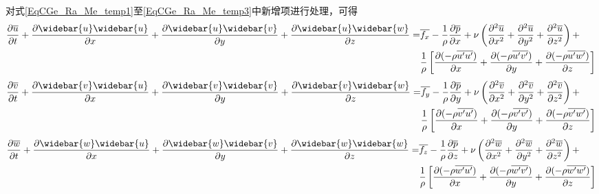 对式\eqref{EqCGe_Ra_Me_temp1}至\eqref{EqCGe_Ra_Me_temp3}中新增项进行处理，可得
\begin{equation}
  \begin{aligned}
    \frac{\partial \overline{u}}{\partial t} +
    \frac{\partial \widebar{u}\widebar{u}}{\partial x} +
    \frac{\partial \widebar{u}\widebar{v}}{\partial y} +
    \frac{\partial \widebar{u}\widebar{w}}{\partial z}
    = 
    &\overline{f_{x}}
    -
    \frac{1}{\rho}
    \frac{\partial \overline{p}}{\partial x} 
    +
    \nu
    \left(
    \frac{\partial^{2} \overline{u}}{\partial x^{2}} +
    \frac{\partial^{2} \overline{u}}{\partial y^{2}} +
    \frac{\partial^{2} \overline{u}}{\partial z^{2}}
    \right)
    +
    \\
    &
    \frac{1}{\rho}
    \left[
      \frac{\partial (-\rho\overline{u^{\prime}u^{\prime}})}{\partial x} +
      \frac{\partial (-\rho\overline{u^{\prime}v^{\prime}})}{\partial y} +
      \frac{\partial (-\rho\overline{u^{\prime}w^{\prime}})}{\partial z}
    \right]
    \label{EqCGe_Ra_Me_1}
  \end{aligned}
\end{equation}
\begin{equation}
  \begin{aligned}
    \frac{\partial \overline{v}}{\partial t} +
    \frac{\partial \widebar{v}\widebar{u}}{\partial x} +
    \frac{\partial \widebar{v}\widebar{v}}{\partial y} +
    \frac{\partial \widebar{v}\widebar{w}}{\partial z}
    = 
    & \overline{f_{y}}
    -
    \frac{1}{\rho}
    \frac{\partial \overline{p}}{\partial y} 
    +
    \nu
    \left(
    \frac{\partial^{2} \overline{v}}{\partial x^{2}} +
    \frac{\partial^{2} \overline{v}}{\partial y^{2}} +
    \frac{\partial^{2} \overline{v}}{\partial z^{2}}
    \right)
    +
    \\
    &
    \frac{1}{\rho}
    \left[
      \frac{\partial (-\rho\overline{v^{\prime}u^{\prime}})}{\partial x} +
      \frac{\partial (-\rho\overline{v^{\prime}v^{\prime}})}{\partial y} +
      \frac{\partial (-\rho\overline{v^{\prime}w^{\prime}})}{\partial z}
    \right]
    \label{EqCGe_Ra_Me_2}
  \end{aligned}
\end{equation}
\begin{equation}
  \begin{aligned}
    \frac{\partial \overline{w}}{\partial t} +
    \frac{\partial \widebar{w}\widebar{u}}{\partial x} +
    \frac{\partial \widebar{w}\widebar{v}}{\partial y} +
    \frac{\partial \widebar{w}\widebar{w}}{\partial z}
    = 
    &\overline{f_{z}}
    -
    \frac{1}{\rho}
    \frac{\partial \overline{p}}{\partial z}
    +
    \nu
    \left(
    \frac{\partial^{2} \overline{w}}{\partial x^{2}} +
    \frac{\partial^{2} \overline{w}}{\partial y^{2}} +
    \frac{\partial^{2} \overline{w}}{\partial z^{2}}
    \right)
    +
    \\
    &
    \frac{1}{\rho}
    \left[
      \frac{\partial (-\rho\overline{w^{\prime}u^{\prime}})}{\partial x} +
      \frac{\partial (-\rho\overline{w^{\prime}v^{\prime}})}{\partial y} +
      \frac{\partial (-\rho\overline{w^{\prime}w^{\prime}})}{\partial z}
    \right]
    \label{EqCGe_Ra_Me_3}
  \end{aligned}
\end{equation}
